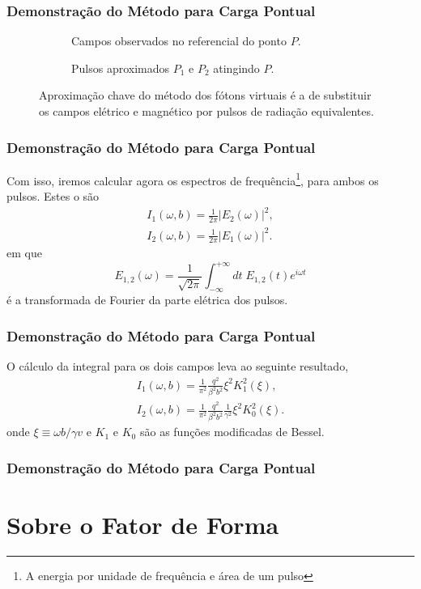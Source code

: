 \documentclass[xcolor=dvipsnames]{beamer}
\begin{document}
\begin{frame}
	\frametitle{Demonstração do Método para Carga Pontual}
	\begin{figure}
		\begin{subfigure}[b]{0.4\textwidth}
			\centering
			
			\caption{Campos observados no referencial do ponto $P$.}
		\end{subfigure}
		\hspace{1cm}
		\begin{subfigure}[b]{0.4\textwidth}
			\centering
			
			\caption{Pulsos aproximados $P_1$ e $P_2$ atingindo $P$.}
		\end{subfigure}
		\caption{Aproximação chave do método dos fótons virtuais é a de
		substituir os campos elétrico e magnético por pulsos de radiação
		equivalentes.}
	\end{figure}
\end{frame}

\begin{frame}
	\frametitle{Demonstração do Método para Carga Pontual}
	Com isso, iremos calcular agora os espectros de frequência\footnote{A
	energia por unidade de frequência e área de um pulso}, para ambos os
	pulsos. Estes o são
	\begin{gather}
		I_1(\omega , b) = \frac{1}{2\pi} |E_2 (\omega) |^2 ,\\
		I_2 (\omega , b) = \frac{1}{2\pi} |E_1 (\omega)|^2.
	\end{gather}
	em que 
	\begin{equation}
		E_{1,2} (\omega) = \frac{1}{\sqrt{2\pi}} \int _{-\infty}^{+\infty}
		dt \; E _{1,2} (t) e^{i\omega t}
	\end{equation}
	é a transformada de Fourier da parte elétrica dos pulsos.
\end{frame}

\begin{frame}
	\frametitle{Demonstração do Método para Carga Pontual}
	O cálculo da integral para os dois campos leva ao seguinte resultado,
	\begin{gather}
		I_1 (\omega , b) = \frac{1}{\pi ^2} \frac{q^2}{ \beta ^2 b^2}  
		\xi ^2 K_1 ^2 \left( \xi \right), \\
		I_2 (\omega , b) = \frac{1}{\pi ^2} \frac{q^2}{\beta ^2 b^2 }
		\frac{1}{\gamma ^2} \xi^2 K_0 ^2 \left( \xi \right).
	\end{gather}
	onde $\xi \equiv \omega b / \gamma v$ e $K_1$ e $K_0$ são as funções
	modificadas de Bessel.
\end{frame}

\begin{frame}
	\frametitle{Demonstração do Método para Carga Pontual}

\end{frame}

\section{Sobre o Fator de Forma}
\end{document}
